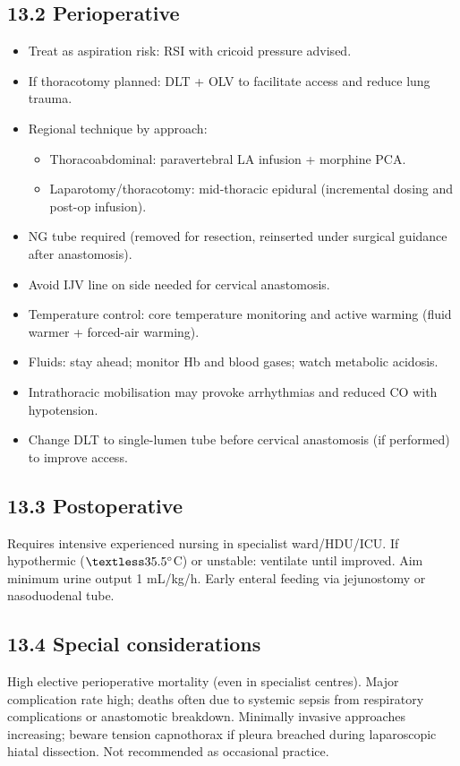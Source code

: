 \documentclass[11pt,a4paper]{article}
\begin{document}
\subsection{13.2 Perioperative}
\begin{itemize}[leftmargin=*, itemsep=2pt]
  \item Treat as aspiration risk: RSI with cricoid pressure advised.
  \item If thoracotomy planned: DLT + OLV to facilitate access and reduce lung trauma.
  \item Regional technique by approach:
  \begin{itemize}[leftmargin=*, itemsep=2pt]
    \item Thoracoabdominal: paravertebral LA infusion + morphine PCA.
    \item Laparotomy/thoracotomy: mid-thoracic epidural (incremental dosing and post-op infusion).
  \end{itemize}
  \item NG tube required (removed for resection, reinserted under surgical guidance after anastomosis).
  \item Avoid IJV line on side needed for cervical anastomosis.
  \item Temperature control: core temperature monitoring and active warming (fluid warmer + forced-air warming).
  \item Fluids: stay ahead; monitor Hb and blood gases; watch metabolic acidosis.
  \item Intrathoracic mobilisation may provoke arrhythmias and reduced CO with hypotension.
  \item Change DLT to single-lumen tube before cervical anastomosis (if performed) to improve access.
\end{itemize}

\subsection{13.3 Postoperative}
Requires intensive experienced nursing in specialist ward/HDU/ICU. If hypothermic (\(\textless 35.5^\circ\)C) or unstable: ventilate until improved. Aim minimum urine output 1 mL/kg/h. Early enteral feeding via jejunostomy or nasoduodenal tube.

\subsection{13.4 Special considerations}
High elective perioperative mortality (even in specialist centres). Major complication rate high; deaths often due to systemic sepsis from respiratory complications or anastomotic breakdown. Minimally invasive approaches increasing; beware tension capnothorax if pleura breached during laparoscopic hiatal dissection. Not recommended as occasional practice.
\end{document}
